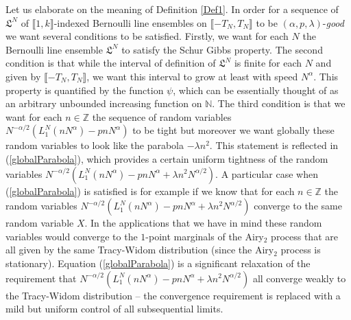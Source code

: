 \begin{remark} Let us elaborate on the meaning of Definition \ref{Def1}. In order for a sequence of $\mathfrak{L}^N $ of $\llbracket 1, k \rrbracket$-indexed Bernoulli line ensembles on $ \llbracket -T_N, T_N \rrbracket$ to be $(\alpha,p,\lambda)$-{\em good} we want several conditions to be satisfied. Firstly, we want for each $N$ the Bernoulli line ensemble $\mathfrak{L}^N$ to satisfy the Schur Gibbs property. The second condition is that while the interval of definition of $\mathfrak{L}^N$ is finite for each $N$ and given by $\llbracket -T_N, T_N \rrbracket$, we want this interval to grow at least with speed $N^{\alpha}$. This property is quantified by the function $\psi$, which can be essentially thought of as an arbitrary unbounded increasing function on $\mathbb{N}$. The third condition is that we want for each $n \in \mathbb{Z}$ the sequence of random variables $N^{-\alpha/2}(L_1^N(n N^{\alpha}) - p n N^{\alpha})$ to be tight but moreover we want globally these random variables to look like the parabola $-\lambda n^2$. This statement is reflected in (\ref{globalParabola}), which provides a certain uniform tightness of the random variables $N^{-\alpha/2}(L_1^N(n N^{\alpha}) - p n N^{\alpha} + \lambda n^2 N^{\alpha/2}) $. A particular case when (\ref{globalParabola}) is satisfied is for example if we know that  for each $n \in \mathbb{Z}$ the random variables $N^{-\alpha/2}(L_1^N(n N^{\alpha}) - p n N^{\alpha} + \lambda n^2 N^{\alpha/2})$ converge to the same random variable $X$. In the applications that we have in mind these random variables would converge to the $1$-point marginals of the Airy$_2$ process that are all given by the same Tracy-Widom distribution (since the Airy$_2$ process is stationary). Equation (\ref{globalParabola}) is a significant relaxation of the requirement that $N^{-\alpha/2}(L_1^N(n N^{\alpha}) - p n N^{\alpha} + \lambda n^2 N^{\alpha/2})$ all converge weakly to the Tracy-Widom distribution -- the convergence requirement is replaced with a mild but uniform control of all subsequential limits.
\end{remark}

